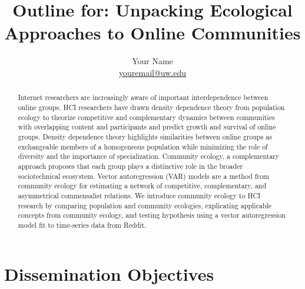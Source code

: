 \documentclass[12pt]{memoir}
\begin{document}
\renewcommand{\arraystretch}{2}
\setlength{\parskip}{4.5pt}

\baselineskip 16pt

\title{Outline for: Unpacking Ecological Approaches to Online Communities }
\author{Your Name\\
        \href{mailto:youremail@uw.edu}{youremail@uw.edu}}
\date{}

\published{\textsc{\textcolor{BrickRed}{This document is an
  unpublished draft.\\ Please do not distribute or cite without
  permission.}}}

\maketitle

\begin{abstract}
Internet researchers are increasingly aware of important interdependence between online groups.  HCI researchers have drawn density dependence theory from population ecology to theorize competitive and complementary dynamics between communities with overlapping content and participants and predict growth and survival of online groups.   Density dependence theory highlights similarities between online groups as exchangeable members of a homogeneous population while minimizing the role of diversity and the importance of specialization.   Community ecology, a complementary approach proposes that each group plays a distinctive role in the broader sociotechnical ecosystem.   Vector autoregression (VAR) models are a method from community ecology  for estimating a network of competitive, complementary, and asymmetrical commensalist relations.  We introduce community ecology to HCI research by comparing population and community ecologies, explicating applicable concepts from community ecology, and testing hypothesis using a vector autoregression model fit to time-series data from Reddit.
\end{abstract}

\section{Dissemination Objectives}
\end{document}
